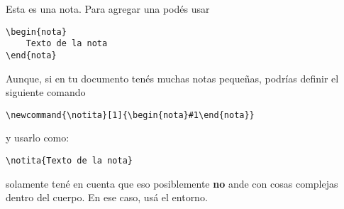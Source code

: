 \documentclass[debug,practica]{lcc}
\begin{document}
\begin{nota}
    Esta es una nota. Para agregar una podés usar
\begin{verbatim}
\begin{nota}
    Texto de la nota
\end{nota}
\end{verbatim}
    Aunque, si en tu documento tenés muchas notas pequeñas, podrías definir el siguiente comando
\begin{verbatim}
\newcommand{\notita}[1]{\begin{nota}#1\end{nota}}
\end{verbatim}
    y usarlo como:
\begin{verbatim}
\notita{Texto de la nota}
\end{verbatim}
    solamente tené en cuenta que eso posiblemente \textbf{no} ande
    con cosas complejas dentro del cuerpo. En ese caso, usá el entorno.
\end{nota}
\end{document}

